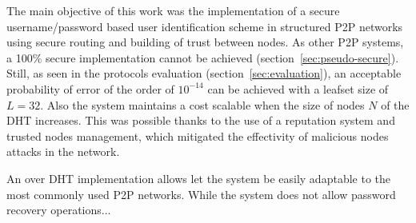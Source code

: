 
The main objective of this work was the implementation of a secure username/password based user identification scheme in structured P2P
networks using secure routing and building of trust between nodes. As other P2P
systems, a 100\% secure implementation cannot be achieved
(section~\ref{sec:pseudo-secure}). Still, as seen in the
protocols evaluation (section~\ref{sec:evaluation}), an acceptable probability of error of the order
of $10^{-14}$ can be achieved with a leafset size of $L = 32$. Also the system
maintains a cost scalable when the size of nodes $N$ of the DHT increases.
This was possible thanks to the use of a reputation system and trusted
nodes management, which mitigated the effectivity of malicious nodes attacks in
the network.

An over DHT implementation allows let the system be easily adaptable  to the
most commonly used P2P networks.
While the system does not allow password recovery operations...
